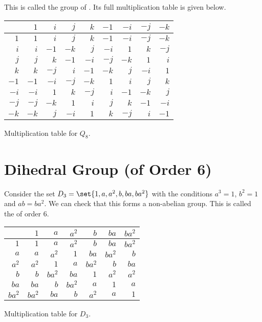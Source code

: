 \documentclass[11pt]{penrose}
\begin{document}
This is called the group of . Its full multiplication table is given below.
\begin{center}
\begin{tabularx}{0.62\textwidth}{|R||R|R|R|R|R|R|R|R|}
    \hline
         & $ 1$ & $ i$ & $ j$ & $ k$ & $-1$ & $-i$ & $-j$ & $-k$ \\ \hline\hline
    $ 1$ & $ 1$ & $ i$ & $ j$ & $ k$ & $-1$ & $-i$ & $-j$ & $-k$ \\ \hline
    $ i$ & $ i$ & $-1$ & $-k$ & $ j$ & $-i$ & $ 1$ & $ k$ & $-j$ \\ \hline
    $ j$ & $ j$ & $ k$ & $-1$ & $-i$ & $-j$ & $-k$ & $ 1$ & $ i$ \\ \hline
    $ k$ & $ k$ & $-j$ & $ i$ & $-1$ & $-k$ & $ j$ & $-i$ & $ 1$ \\ \hline
    $-1$ & $-1$ & $-i$ & $-j$ & $-k$ & $ 1$ & $ i$ & $ j$ & $ k$ \\ \hline
    $-i$ & $-i$ & $ 1$ & $ k$ & $-j$ & $ i$ & $-1$ & $-k$ & $ j$ \\ \hline
    $-j$ & $-j$ & $-k$ & $ 1$ & $ i$ & $ j$ & $ k$ & $-1$ & $-i$ \\ \hline
    $-k$ & $-k$ & $ j$ & $-i$ & $ 1$ & $ k$ & $-j$ & $ i$ & $-1$ \\ \hline
\end{tabularx}

{Multiplication table for $Q_8$.}
\end{center}

\section{Dihedral Group (of Order 6)}
Consider the set $D_3  =\set{1, a, a^2, b, ba, ba^2}$ with the conditions $a^3 = 1$, $b^2 = 1$ and $ab = ba^2$. We can check that this forms a non-abelian group. This is called the  of order $6$.

\begin{center}
\begin{tabularx}{0.62\textwidth}{|R||R|R|R|R|R|R|}
    \hline
           & $   1$ & $   a$ & $ a^2$ & $   b$ & $  ba$ & $ba^2$ \\ \hline\hline
    $   1$ & $   1$ & $   a$ & $ a^2$ & $   b$ & $  ba$ & $ba^2$ \\ \hline
    $   a$ & $   a$ & $ a^2$ & $   1$ & $  ba$ & $ba^2$ & $   b$ \\ \hline
    $ a^2$ & $ a^2$ & $   1$ & $   a$ & $ba^2$ & $   b$ & $  ba$ \\ \hline
    $   b$ & $   b$ & $ba^2$ & $  ba$ & $   1$ & $ a^2$ & $ a^2$ \\ \hline
    $  ba$ & $  ba$ & $   b$ & $ba^2$ & $   a$ & $   1$ & $   a$ \\ \hline
    $ba^2$ & $ba^2$ & $  ba$ & $   b$ & $ a^2$ & $   a$ & $   1$ \\ \hline
\end{tabularx}

{Multiplication table for $D_3$.}
\end{center}
\end{document}
